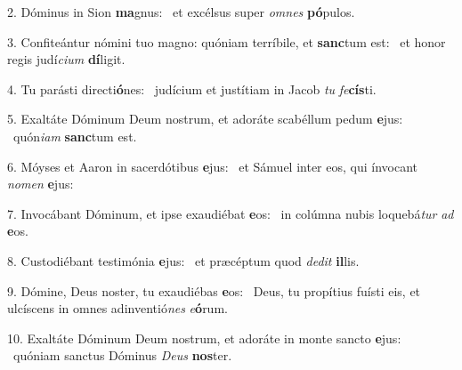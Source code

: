 2. Dóminus in Sion \textbf{ma}gnus: \ast\  et excélsus super \textit{om}\textit{nes} \textbf{pó}pulos.\

3. Confiteántur nómini tuo magno: quóniam terríbile, et \textbf{sanc}tum est: \ast\  et honor regis judí\textit{ci}\textit{um} \textbf{dí}ligit.\

4. Tu parásti directi\textbf{ó}nes: \ast\  judícium et justítiam in Jacob \textit{tu} \textit{fe}\textbf{cís}ti.\

5. Exaltáte Dóminum Deum nostrum, et adoráte scabéllum pedum \textbf{e}jus: \ast\  quón\textit{i}\textit{am} \textbf{sanc}tum est.\

6. Móyses et Aaron in sacerdótibus \textbf{e}jus: \ast\  et Sámuel inter eos, qui ínvocant \textit{no}\textit{men} \textbf{e}jus:\

7. Invocábant Dóminum, et ipse exaudiébat \textbf{e}os: \ast\  in colúmna nubis loquebá\textit{tur} \textit{ad} \textbf{e}os.\

8. Custodiébant testimónia \textbf{e}jus: \ast\  et præcéptum quod \textit{de}\textit{dit} \textbf{il}lis.\

9. Dómine, Deus noster, tu exaudiébas \textbf{e}os: \ast\  Deus, tu propítius fuísti eis, et ulcíscens in omnes adinventió\textit{nes} \textit{e}\textbf{ó}rum.\

10. Exaltáte Dóminum Deum nostrum, et adoráte in monte sancto \textbf{e}jus: \ast\  quóniam sanctus Dóminus \textit{De}\textit{us} \textbf{nos}ter.\

